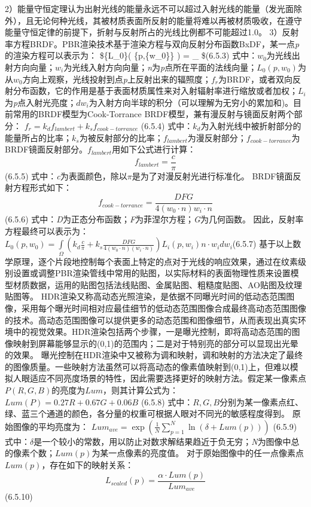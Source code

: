 {{{{{{2）能量守恒定理认为出射光线的能量永远不可以超过入射光线的能量（发光面除外），且无论何种光线，其被材质表面所反射的能量将难以再被材质吸收，在遵守能量守恒定律的前提下，折射与反射所占的光线比例都不可能超过1.0。 3）反射率方程BRDF。PBR渲染技术基于渲染方程与双向反射分布函数BxDF，某一点\emph{p}的渲染方程可以表示为： \$\{L\_0\}\left( \{p,\{w\_0\}\} \right) = \int\_ \$(6.5.3) 式中：\(w_0\)为光线出射方向向量；\(w_i\)为光线入射方向向量；\emph{n}为\emph{p}点所在平面的法线向量；\({L_0}\left( {p,{w_0}} \right)\)为从\(w_0\)方向上观察，光线投射到点\emph{p}上反射出来的辐照度；\(f_r\)为BRDF，或者双向反射分布函数，它的作用是基于表面材质属性来对入射辐射率进行缩放或者加权；\(L_i\)为\emph{p}点入射光亮度；\(dw_i\)为入射方向半球的积分（可以理解为无穷小的累加和)。目前常用的BRDF模型为Cook-Torrance BRDF模型，兼有漫反射与镜面反射两个部分： \({f_r} = {k_d}{f_{lambert}} + {k_s}{f_{cook - torrance}}\) (6.5.4) 式中：\(k_d\)为入射光线中被折射部分的能量所占的比率；\(k_s\)为被反射部分的比率；\(f_{lambert}\)为漫反射部分；\(f_{cook-torrance}\)为BRDF镜面反射部分。\(f_{lambert}\)用如下公式进行计算： \[f_{lambert}=\frac{c}{\pi}\] (6.5.5) 式中：\emph{c}为表面颜色，除以\(\pi\)是为了对漫反射光进行标准化。 BRDF镜面反射方程形式如下： \[f_{cook-torrance}=\frac{DFG}{4(w_0\cdot n){w_i \cdot n}}\] (6.5.6) 式中：\emph{D}为正态分布函数；\emph{F}为菲涅尔方程；\emph{G}为几何函数。 因此，反射率方程最终可以表示为： \({L_0}\left( {p,{w_0}} \right) = \int\limits_\Omega {\left( {{k_d}\frac{c}{\pi } + {k_s}\frac{{DFG}}{{4\left( {{w_0} \cdot n} \right)\left( {{w_i} \cdot n} \right)}}} \right){L_i}} \left( {p,{w_i}} \right)n \cdot {w_i}d{w_i}\)(6.5.7) 基于以上数学原理，逐个片段地控制每个表面上特定的点对于光线的响应效果，通过在纹素级别设置或调整PBR渲染管线中常用的贴图，以实际材料的表面物理性质来设置模型材质数据，运用的贴图包括法线贴图、金属贴图、粗糙度贴图、AO贴图及纹理贴图等。 HDR渲染又称高动态光照渲染，是依据不同曝光时间的低动态范围图像，采用每个曝光时间相对应最佳细节的低动态范围图像合成最终高动态范围图像的技术。高动态范围图像可以提供更多的动态范围和图像细节，从而表现出真实环境中的视觉效果。HDR渲染包括两个步骤，一是曝光控制，即将高动态范围的图像映射到屏幕能够显示的(0,1)的范围内；二是对于特别亮的部分可以显现出光晕的效果。 曝光控制在HDR渲染中又被称为调和映射，调和映射的方法决定了最终的图像质量。一些映射方法虽然可以将高动态的像素值映射到(0,1)上，但难以模拟人眼适应不同亮度场景的特性，因此需要选择更好的映射方法。假定某一像素点\(P(R,G,B)\)的亮度为\(Lum\)，则其计算公式为： \(Lum\left( P \right) = 0.27R + 0.67G + 0.06B\) (6.5.8) 式中：\(R,G,B\)分别为某一像素点红、绿、蓝三个通道的颜色，各分量的权重可根据人眼对不同光的敏感程度得到。 原始图像的平均亮度为： \(Lu{m_{ave}} = \exp \left( {\frac{1}{N}\sum\limits_{p = 1}^N {\ln \left( {\delta + Lum\left( p \right)} \right)} } \right)\) (6.5.9) 式中：\(\delta\)是一个较小的常数，用以防止对数求解结果趋近于负无穷；\emph{N}为图像中总的像素个数；\(Lum(p)\)为某一点像素的亮度值。 对于原始图像中的任一点像素点\(Lum(p)\)，存在如下的映射关系： \[{L_{scaled}}\left( p \right) = \frac{{\alpha \cdot Lum\left( p \right)}}{{Lu{m_{ave}}}}\](6.5.10) }}}}}}
